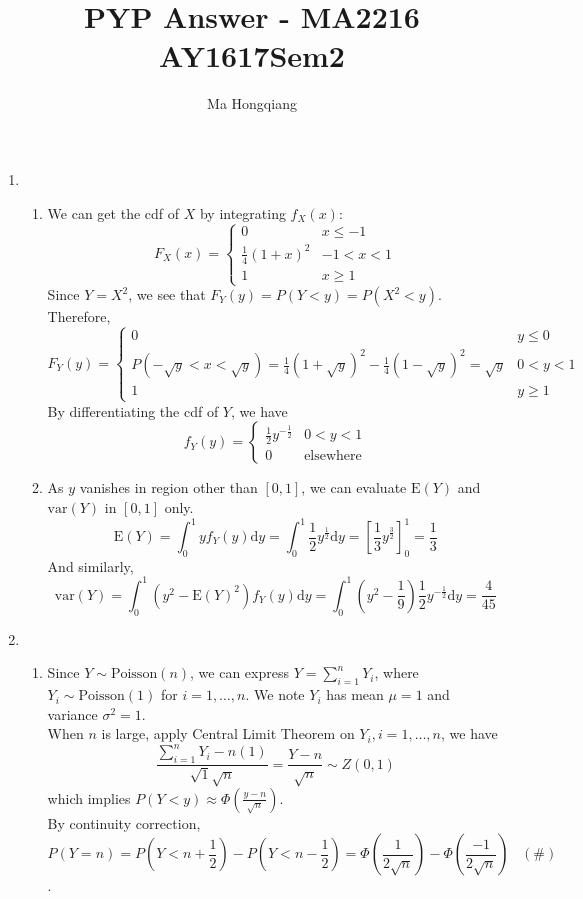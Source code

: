 \documentclass[12pt]{article}
\newcommand{\diff}{\mathrm{d}}
\newcommand{\expec}{\mathrm{E}}
\newcommand{\var}{\mathrm{var}}
\newcommand{\Poi}{\mathrm{Poisson}}
\theoremstyle{definition}
\begin{document}
\title{PYP Answer - MA2216 AY1617Sem2}
\author{Ma Hongqiang}
\maketitle
\begin{enumerate}
  \item \begin{enumerate}
  \item We can get the cdf of $X$ by integrating $f_X(x)$:
  \[
F_X(x)=\begin{cases}
0&x\leq -1\\
\frac{1}{4}(1+x)^2&-1<x<1\\
1&x\geq 1
\end{cases}
  \]
  Since $Y=X^2$, we see that $F_Y(y)=P(Y<y)=P(X^2<y)$. Therefore,
  \[
F_Y(y)=\begin{cases}
0&y\leq 0\\
P(-\sqrt{y}<x<\sqrt{y})=\frac{1}{4}(1+\sqrt{y})^2-\frac{1}{4}(1-\sqrt{y})^2=\sqrt{y}&0<y<1\\
1&y\geq 1
\end{cases}
  \]
  By differentiating the cdf of $Y$, we have
  \[
f_Y(y)=\begin{cases}
\frac{1}{2}y^{-\frac{1}{2}}&0<y<1\\
0&\text{elsewhere}
\end{cases}
  \]
  \item As $y$ vanishes in region other than $[0,1]$, we can evaluate $\expec(Y)$ and $\var(Y)$ in $[0,1]$ only.
  \[
\expec(Y)=\int_0^1 yf_Y(y)\diff y = \int_0^1 \frac{1}{2}y^\frac{1}{2}\diff y = \left[\frac{1}{3}y^\frac{3}{2}\right]_0^1 = \frac{1}{3}
  \]
  And similarly,
  \[
\var(Y) = \int_0^1(y^2-\expec(Y)^2)f_Y(y)\diff y = \int_0^1(y^2-\frac{1}{9})\frac{1}{2}y^{-\frac{1}{2}}\diff y = \frac{4}{45}
  \]
        \end{enumerate}
\item\begin{enumerate}
\item Since $Y\sim\Poi(n)$, we can express $Y = \sum_{i=1}^nY_i$, where $Y_i\sim\Poi(1)$ for $i=1,\ldots, n$. We note $Y_i$ has mean $\mu=1$ and variance $\sigma^2=1$.\\When $n$ is large, apply Central Limit Theorem on $Y_i,i=1,\ldots, n$, we have
\[
\frac{\sum_{i=1}^n Y_i-n(1)}{\sqrt{1}\sqrt{n}}=\frac{Y-n}{\sqrt{n}}\sim Z(0,1)
\]
which implies $P(Y<y)\approx \Phi(\frac{y-n}{\sqrt{n}})$.\\
By continuity correction, \[P(Y=n)=P(Y<n+\frac{1}{2})-P(Y<n-\frac{1}{2})=\Phi(\frac{1}{2\sqrt{n}})-\Phi(\frac{-1}{2\sqrt{n}})\;\;\;(\#)\]. 

\end{enumerate}
\end{enumerate}
\end{document}
